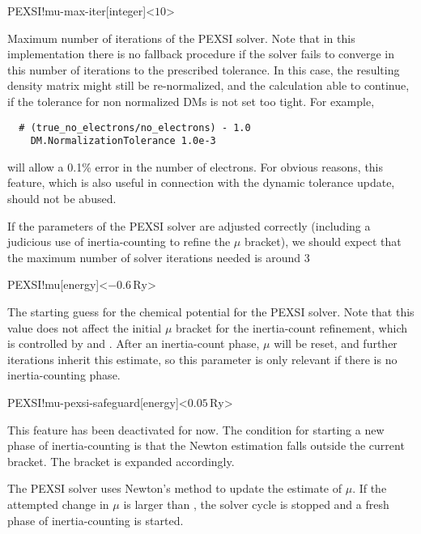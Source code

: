 \begin{fdfentry}{PEXSI!mu-max-iter}[integer]<$10$>

  Maximum number of iterations of the PEXSI solver. Note that in this
  implementation there is no fallback procedure if the solver fails to
  converge in this number of iterations to the prescribed
  tolerance. In this case, the resulting density matrix might still be
  re-normalized, and the calculation able to continue, if the
  tolerance for non normalized DMs is not set too tight. For example,
\begin{verbatim}
  # (true_no_electrons/no_electrons) - 1.0
    DM.NormalizationTolerance 1.0e-3  
\end{verbatim}
  will allow a 0.1\% error in the number of electrons. For obvious
  reasons, this feature, which is also useful in connection with the
  dynamic tolerance update, should not be abused.

  If the parameters of the PEXSI solver are adjusted correctly
  (including a judicious use of inertia-counting to refine the $\mu$
  bracket), we should expect that the maximum number of solver
  iterations needed is around 3

\end{fdfentry}

\begin{fdfentry}{PEXSI!mu}[energy]<$-0.6\,\mathrm{Ry}$>
  
  The starting guess for the chemical potential for the PEXSI
  solver. Note that this value does not affect the initial $\mu$
  bracket for the inertia-count refinement, which is controlled by
   and . After an inertia-count
  phase, $\mu$ will be reset, and further iterations inherit this
  estimate, so this parameter is only relevant if there is no
  inertia-counting phase.

\end{fdfentry}

\begin{fdfentry}{PEXSI!mu-pexsi-safeguard}[energy]<$0.05\,\mathrm{Ry}$>

  \note This feature has been deactivated for now. The condition for
  starting a new phase of inertia-counting is that the Newton
  estimation falls outside the current bracket. The bracket is
  expanded accordingly.
        
  The PEXSI solver uses Newton's method to update the estimate of
  $\mu$.  If the attempted change in $\mu$ is larger than
  , the solver cycle is stopped and a
  fresh phase of inertia-counting is started.

\end{fdfentry}

